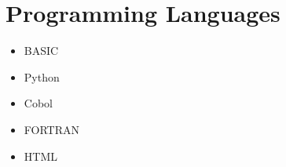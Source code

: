 \documentclass{article}
\begin{document}
	\section{Programming Languages}
	\begin{itemize}
		\item BASIC
		\item Python
		\item Cobol
		\item FORTRAN
		\item HTML
	\end{itemize}
\end{document}
